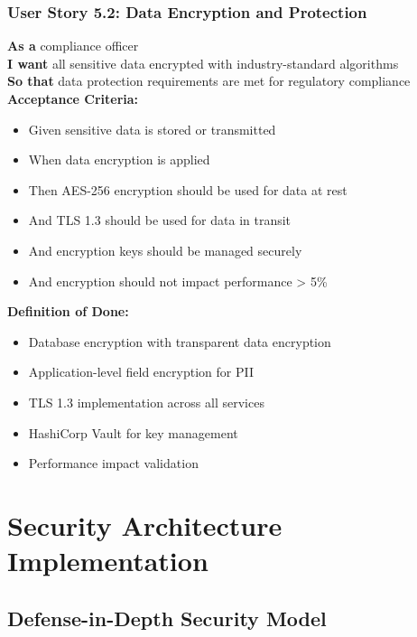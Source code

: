 \subsubsection{User Story 5.2: Data Encryption and Protection}

\begin{tcolorbox}[colback=lightgray, colframe=primaryblue, title=US-5.2: Data Encryption and Protection]
\textbf{As a} compliance officer \\
\textbf{I want} all sensitive data encrypted with industry-standard algorithms \\
\textbf{So that} data protection requirements are met for regulatory compliance \\

\textbf{Acceptance Criteria:}
\begin{itemize}
    \item Given sensitive data is stored or transmitted
    \item When data encryption is applied
    \item Then AES-256 encryption should be used for data at rest
    \item And TLS 1.3 should be used for data in transit
    \item And encryption keys should be managed securely
    \item And encryption should not impact performance > 5\%
\end{itemize}

\textbf{Definition of Done:}
\begin{itemize}
    \item Database encryption with transparent data encryption
    \item Application-level field encryption for PII
    \item TLS 1.3 implementation across all services
    \item HashiCorp Vault for key management
    \item Performance impact validation
\end{itemize}
\end{tcolorbox}

\section{Security Architecture Implementation}

\subsection{Defense-in-Depth Security Model}

